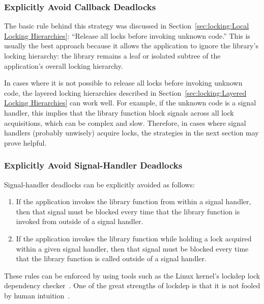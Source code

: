 \subsubsection{Explicitly Avoid Callback Deadlocks}
\label{sec:locking:Explicitly Avoid Callback Deadlocks}

The basic rule behind this strategy was discussed in
Section~\ref{sec:locking:Local Locking Hierarchies}: ``Release all
locks before invoking unknown code.''
This is usually the best approach because it allows the application to
ignore the library's locking hierarchy: the library remains a leaf or
isolated subtree of the application's overall locking hierarchy.

In cases where it is not possible to release all locks before invoking
unknown code, the layered locking hierarchies described in
Section~\ref{sec:locking:Layered Locking Hierarchies} can work well.
For example, if the unknown code is a signal handler, this implies that
the library function block signals across all lock acquisitions, which
can be complex and slow.
Therefore, in cases where signal handlers (probably unwisely) acquire
locks, the strategies in the next section may prove helpful.

\subsubsection{Explicitly Avoid Signal-Handler Deadlocks}
\label{sec:locking:Explicitly Avoid Signal-Handler Deadlocks}

Signal-handler deadlocks can be explicitly avoided as follows:

\begin{enumerate}
\item	If the application invokes the library function from
	within a signal handler, then that signal must be blocked
	every time that the library function is invoked from outside
	of a signal handler.
\item	If the application invokes the library function
	while holding a lock acquired within a given signal
	handler, then that signal must be blocked every time that the
	library function is called outside of a signal handler.
\end{enumerate}

These rules can be enforced by using tools such as
the Linux kernel's lockdep lock dependency
checker~\cite{JonathanCorbet2006lockdep}.
One of the great strengths of lockdep is that it is not fooled by
human intuition~\cite{StevenRostedt2011locdepCryptic}.

